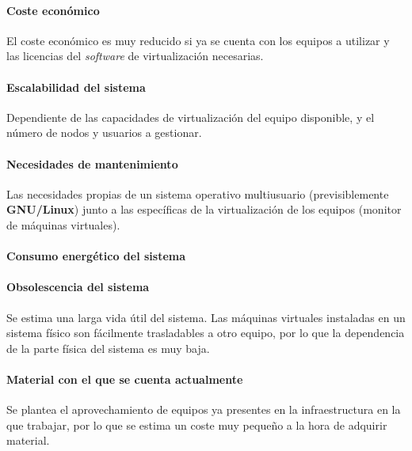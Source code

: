 \paragraph{Coste económico\\}

El coste económico es muy reducido si ya se cuenta con los equipos a utilizar y las licencias del \textit{software} de virtualización necesarias.

\paragraph{Escalabilidad del sistema\\}

Dependiente de las capacidades de virtualización del equipo disponible, y el número de nodos y usuarios a gestionar.

\paragraph{Necesidades de mantenimiento\\}

Las necesidades propias de un sistema operativo multiusuario (previsiblemente \textbf{GNU/Linux}) junto a las específicas de la virtualización de los equipos (monitor de máquinas virtuales).

\paragraph{Consumo energético del sistema\\}

\citationneeded[Andrés]{}

\paragraph{Obsolescencia del sistema\\}

Se estima una larga vida útil del sistema. Las máquinas virtuales instaladas en un sistema físico son fácilmente trasladables a otro equipo, por lo que la dependencia de la parte física del sistema es muy baja.

\paragraph{Material con el que se cuenta actualmente\\}

Se plantea el aprovechamiento de equipos ya presentes en la infraestructura en la que trabajar, por lo que se estima un coste muy pequeño a la hora de adquirir material.

